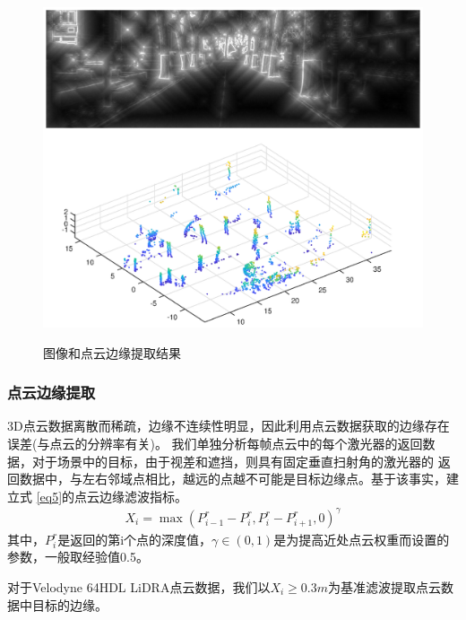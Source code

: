 \begin{figure}[htbp]
	\centering
    \includegraphics[width=18cm]{fig/IDT.eps} \\
	\caption{图像和点云边缘提取结果}\label{fig: IDT-FIL}
\end{figure}

\subsubsection{点云边缘提取}
3D点云数据离散而稀疏，边缘不连续性明显，因此利用点云数据获取的边缘存在误差(与点云的分辨率有关)。
我们单独分析每帧点云中的每个激光器的返回数据，对于场景中的目标，由于视差和遮挡，则具有固定垂直扫射角的激光器的
返回数据中，与左右邻域点相比，越远的点越不可能是目标边缘点。基于该事实，建立式 \eqref{eq5}的点云边缘滤波指标。
\begin{equation}\label{eq5}
\begin{aligned}
X_i=\max(P_{i-1}^{r}-P_{i}^{r}, P_{i}^{r}-P_{i+1}^{r}, 0)^\gamma
\end{aligned}
\end{equation}
其中，$P_{i}^{r}$是返回的第i个点的深度值，$\gamma \in(0, 1)$是为提高近处点云权重而设置的参数，一般取经验值0.5。

对于Velodyne 64HDL LiDRA点云数据，我们以$X_i\ge 0.3m$为基准滤波提取点云数据中目标的边缘。


